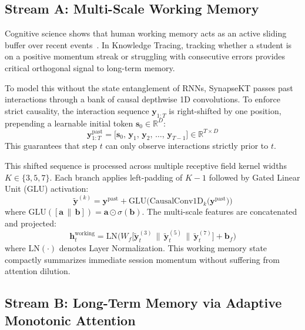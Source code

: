 \documentclass[11pt]{article}
\begin{document}
\subsection{Stream A: Multi-Scale Working Memory}
\label{sec:stream_a}

Cognitive science shows that human working memory acts as an active sliding buffer over recent events~\citep{baddeley1992working}. In Knowledge Tracing, tracking whether a student is on a positive momentum streak or struggling with consecutive errors provides critical orthogonal signal to long-term memory.

To model this without the state entanglement of RNNs, SynapseKT passes past interactions through a bank of causal depthwise 1D convolutions. To enforce strict causality, the interaction sequence $\mathbf{y}_{1:T}$ is right-shifted by one position, prepending a learnable initial token $\mathbf{s}_0 \in \mathbb{R}^D$:
\begin{equation}
\mathbf{y}^{\text{past}}_{1:T} = \big[ \mathbf{s}_0,\, \mathbf{y}_1,\, \mathbf{y}_2,\, \dots,\, \mathbf{y}_{T-1} \big] \in \mathbb{R}^{T \times D}
\end{equation}
This guarantees that step $t$ can only observe interactions strictly prior to $t$.

This shifted sequence is processed across multiple receptive field kernel widths $K \in \{3, 5, 7\}$. Each branch applies left-padding of $K-1$ followed by Gated Linear Unit (GLU) activation:
\begin{equation}
\tilde{\mathbf{y}}^{(k)} = \mathbf{y}^{\text{past}} + \text{GLU}\Big(\text{CausalConv1D}_k\big(\mathbf{y}^{\text{past}}\big)\Big)
\end{equation}
where $\text{GLU}([\mathbf{a} \,\|\, \mathbf{b}]) = \mathbf{a} \odot \sigma(\mathbf{b})$. The multi-scale features are concatenated and projected:
\begin{equation}
\mathbf{h}_t^{\text{working}} = \text{LN}\Big(W_f \big[ \tilde{\mathbf{y}}_t^{(3)} \,\|\, \tilde{\mathbf{y}}_t^{(5)} \,\|\, \tilde{\mathbf{y}}_t^{(7)} \big] + \mathbf{b}_f\Big)
\end{equation}
where $\text{LN}(\cdot)$ denotes Layer Normalization. This working memory state compactly summarizes immediate session momentum without suffering from attention dilution.

\subsection{Stream B: Long-Term Memory via Adaptive Monotonic Attention}
\label{sec:stream_b}
\end{document}
